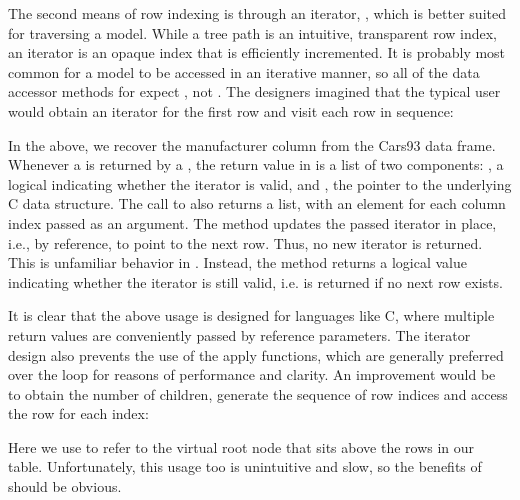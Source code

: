 The second means of row indexing is through an iterator,
, which is better suited for traversing a model.
While a tree path is an intuitive, transparent row index, an iterator
is an opaque index that is efficiently incremented. It is
probably most common for a model to be accessed in an iterative
manner, so all of the data accessor methods for 
expect , not . The \GTK\/
designers imagined that the typical user would obtain an iterator for
the first row and visit each row in sequence:
\begin{Schunk}
\end{Schunk}
%
In the above, we recover the manufacturer column from the Cars93 data
frame. Whenever a  is returned by a
, the return value in \R\/ is a list of two
components: , a logical indicating whether the iterator
is valid, and , the pointer to the underlying C data
structure. The call to  also returns a list,
with an element for each column index passed as an argument. The
method  updates the passed iterator in
place, i.e., by reference, to point to the next row. Thus, no new
iterator is returned. This is unfamiliar behavior in \R. Instead, the
method returns a logical value indicating whether the iterator is
still valid, i.e.  is returned if no next row exists.

It is clear that the above usage is designed for languages like C,
where multiple return values are conveniently passed by reference
parameters. The iterator design also prevents the use of the apply
functions, which are generally preferred over the  loop
for reasons of performance and clarity. An improvement would be to
obtain the number of children, generate the sequence of row indices
and access the row for each index:
\begin{Schunk}
\end{Schunk}
%
Here we use  to refer to the virtual root node that sits
above the rows in our table. Unfortunately, this usage too is
unintuitive and slow, so the benefits of  should
be obvious.

